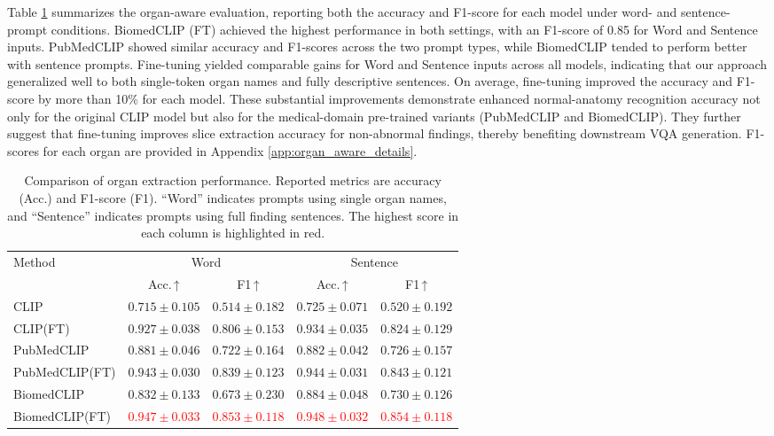 \documentclass[bioengineering,article,submit,pdftex,moreauthors]{Definitions/mdpi}
\begin{document}
Table \ref{tab:organ_extraction_results} summarizes the organ-aware evaluation, reporting both the accuracy and F1-score for each model under word- and sentence-prompt conditions. 
BiomedCLIP (FT) achieved the highest performance in both settings, with an F1-score of 0.85 for Word and Sentence inputs. 
PubMedCLIP showed similar accuracy and F1-scores across the two prompt types, while BiomedCLIP tended to perform better with sentence prompts. 
Fine-tuning yielded comparable gains for Word and Sentence inputs across all models, indicating that our approach generalized well to both single-token organ names and fully descriptive sentences. 
On average, fine-tuning improved the accuracy and F1-score by more than 10\% for each model. 
These substantial improvements demonstrate enhanced normal-anatomy recognition accuracy not only for the original CLIP model but also for the medical-domain pre-trained variants (PubMedCLIP and BiomedCLIP). 
They further suggest that fine-tuning improves slice extraction accuracy for non-abnormal findings, thereby benefiting downstream VQA generation.
F1-scores for each organ are provided in Appendix \ref{app:organ_aware_details}.


\begin{table}[ht]
  \centering
  \caption{Comparison of organ extraction performance. Reported metrics are accuracy (Acc.) and F1-score (F1). 
  “Word” indicates prompts using single organ names, and “Sentence” indicates prompts using full finding sentences. 
  The highest score in each column is highlighted in red.}
  \label{tab:organ_extraction_results}
  \begin{tabular}{lcccc}
    \toprule
    \multirow{2}{*}{Method} & \multicolumn{2}{c}{Word}               & \multicolumn{2}{c}{Sentence}           \\
    \cmidrule(lr){2-3}\cmidrule(lr){4-5}
                           & Acc.\,↑ & F1\,↑         & Acc.\,↑   & F1\,↑         \\ 
    \midrule
    CLIP                    & $0.715\pm0.105$ & $0.514\pm0.182$ & $0.725\pm0.071$ & $0.520\pm0.192$ \\
    CLIP(FT)                & $0.927\pm0.038$ & $0.806\pm0.153$ & $0.934\pm0.035$ & $0.824\pm0.129$ \\
    PubMedCLIP              & $0.881\pm0.046$ & $0.722\pm0.164$ & $0.882\pm0.042$ & $0.726\pm0.157$ \\
    PubMedCLIP(FT)          & $0.943\pm0.030$ & $0.839\pm0.123$ & $0.944\pm0.031$ & $0.843\pm0.121$ \\
    BiomedCLIP              & $0.832\pm0.133$ & $0.673\pm0.230$ & $0.884\pm0.048$ & $0.730\pm0.126$ \\
    BiomedCLIP(FT)          & \textcolor{red}{$0.947\pm0.033$} & \textcolor{red}{$0.853\pm0.118$} & \textcolor{red}{$0.948\pm0.032$} & \textcolor{red}{$0.854\pm0.118$} \\
    \bottomrule
  \end{tabular}
\end{table}
\end{document}

